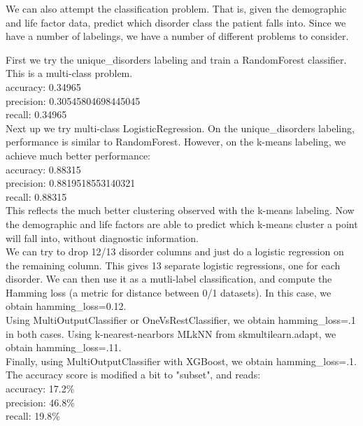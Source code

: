 \documentclass[11pt]{amsart}
\begin{document}
We can also attempt the classification problem. That is, given the demographic and life factor data, predict which disorder class the patient falls into. Since we have a number of labelings, we have a number of different problems to consider. 

First we try the unique\_disorders labeling and train a RandomForest classifier. This is a multi-class problem. \\

\noindent accuracy: 0.34965 \\
precision: 0.30545804698445045 \\
recall: 0.34965 \\

Next up we try multi-class LogisticRegression. On the unique\_disorders labeling, performance is similar to RandomForest. However, on the k-means labeling, we achieve much better performance: \\

\noindent accuracy: 0.88315 \\
precision: 0.8819518553140321 \\
recall: 0.88315 \\

This reflects the much better clustering observed with the k-means labeling. Now the demographic and life factors are able to predict which k-means cluster a point will fall into, without diagnostic information. \\

We can try to drop 12/13 disorder columns and just do a logistic regression on the remaining column. This gives 13 separate logistic regressions, one for each disorder. We can then use it as a mutli-label classification, and compute the Hamming loss (a metric for distance between 0/1 datasets). In this case, we obtain hamming\_loss=0.12. \\

Using MultiOutputClassifier or OneVsRestClassifier, we obtain hamming\_loss=.1 in both cases. Using k-nearest-nearbors MLkNN from skmultilearn.adapt, we obtain hamming\_loss=.11. \\

Finally, using MultiOutputClassifier with XGBoost, we obtain hamming\_loss=.1. The accuracy score is modified a bit to "subset", and reads: \\

\noindent accuracy: 17.2\% \\
precision: 46.8\% \\
recall: 19.8\% \\
\end{document}
